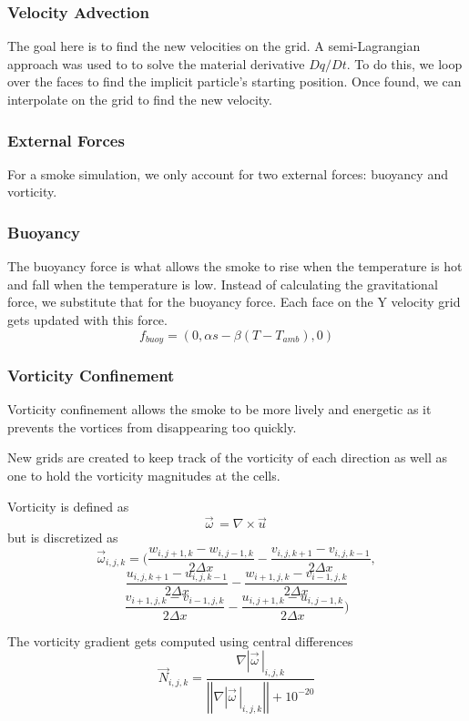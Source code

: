\documentclass[a4paper]{article}
\begin{document}
    \subsubsection{Velocity Advection}
    The goal here is to find the new velocities on the grid. A semi-Lagrangian approach was used to to solve the material derivative $ Dq / Dt $. To do this, we loop over the faces to find the implicit particle's starting position. Once found, we can interpolate on the grid to find the new velocity. 
    
    \subsubsection{External Forces}
    For a smoke simulation, we only account for two external forces: buoyancy and vorticity. 
    
    \subsubsection*{Buoyancy}
    The buoyancy force is what allows the smoke to rise when the temperature is hot and fall when the temperature is low. Instead of calculating the gravitational force, we substitute that for the buoyancy force. Each face on the Y velocity grid gets updated with this force. 
    \[ f_{buoy} = (0, \alpha s - \beta(T - T_{amb}), 0) \]
    
    \subsubsection*{Vorticity Confinement}
    Vorticity confinement allows the smoke to be more lively and energetic as it prevents the vortices from disappearing too quickly.
    
    \noindent New grids are created to keep track of the vorticity of each direction as well as one to hold the vorticity magnitudes at the cells.
    
    \noindent Vorticity is defined as
    \[ \vec{\omega}^{\,} = \nabla \times \vec{u}^{\,} \] \newline
    \noindent but is discretized as 
    \[ \vec{\omega}^{\,}_{i, j, k} = (\frac{w_{i,j+1,k} - w_{i,j-1,k}}{2\Delta x} - \frac{v_{i,j,k+1} - v_{i,j,k-1}}{2\Delta x},\]
    \[\frac{u_{i,j,k+1} - u_{i,j,k-1}}{2\Delta x} - \frac{w_{i+1,j,k} - v_{i-1,j,k}}{2\Delta x}\]
    \[\frac{v_{i+1,j,k} - v_{i-1,j,k}}{2\Delta x} - \frac{u_{i,j+1,k} - u_{i,j-1,k}}{2\Delta x}) \]
    
    \noindent The vorticity gradient gets computed using central differences
    \[ \vec{N}^{\,}_{i,j,k} = \frac{\nabla |{\vec{\omega}^{\,}}|_{i,j,k}}{|{|{\nabla |{\vec{\omega}^{\,}}|_{i,j,k}}|}| + 10^{{-20}}} \]
    
\end{document}
